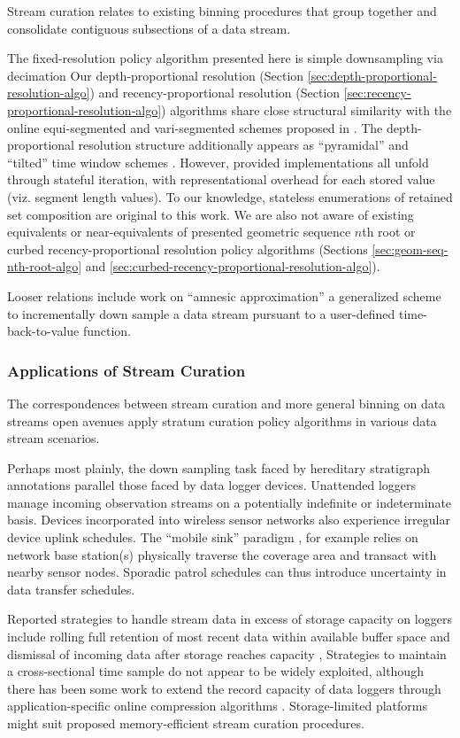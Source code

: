 Stream curation relates to existing binning procedures that group together and consolidate contiguous subsections of a data stream.

The fixed-resolution policy algorithm presented here is simple downsampling via decimation \citep[p. 31]{crochiere1983multirate}
Our depth-proportional resolution (Section \ref{sec:depth-proportional-resolution-algo}) and recency-proportional resolution (Section \ref{sec:recency-proportional-resolution-algo}) algorithms share close structural similarity with the online equi-segmented and vari-segmented schemes proposed in
\citep{zhao2005generalized}.
The depth-proportional resolution structure additionally appears as ``pyramidal'' and ``tilted'' time window schemes \citep{aggarwal2003framework,han2005stream}.
However, provided implementations all unfold through stateful iteration, with representational overhead for each stored value (viz. segment length values).
To our knowledge, stateless enumerations of retained set composition are original to this work.
We are also not aware of existing equivalents or near-equivalents of presented geometric sequence $n$th root or curbed recency-proportional resolution policy algorithms (Sections \ref{sec:geom-seq-nth-root-algo} and \ref{sec:curbed-recency-proportional-resolution-algo}).

Looser relations include work on ``amnesic approximation'' a generalized scheme to incrementally down sample a data stream pursuant to a user-defined time-back-to-value function.

\subsubsection{Applications of Stream Curation}

The correspondences between stream curation and more general binning on data streams open avenues apply stratum curation policy algorithms in various data stream scenarios.

Perhaps most plainly, the down sampling task faced by hereditary stratigraph annotations parallel those faced by data logger devices.
Unattended loggers manage incoming observation streams on a potentially indefinite or indeterminate basis.
Devices incorporated into wireless sensor networks also experience irregular device uplink schedules.
The ``mobile sink'' paradigm \citep{jain2022survey}, for example relies on network base station(s) physically traverse the coverage area and transact with nearby sensor nodes.
Sporadic patrol schedules can thus introduce uncertainty in data transfer schedules.

Reported strategies to handle stream data in excess of storage capacity on loggers include rolling full retention of most recent data within available buffer space \citep{fincham1995use} and dismissal of incoming data after storage reaches capacity \citep{saunders1989portable,mahzan2017design},
Strategies to maintain a cross-sectional time sample do not appear to be widely exploited, although there has been some work to extend the record capacity of data loggers through application-specific online compression algorithms \citep{hadiatna2016design}.
Storage-limited platforms might suit proposed memory-efficient stream curation procedures.
